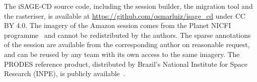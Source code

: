 
The iSAGE-CD source code, including the session builder, the
migration tool and the rasteriser, is available at
\url{https://github.com/osmarluiz/isage_cd} under CC BY 4.0. The
imagery of the Amazon session comes from the Planet NICFI
programme~\cite{nicfi2021basemaps} and cannot be redistributed by
the authors. The sparse annotations of the session are available
from the corresponding author on reasonable request, and can be
reused by any team with its own access to the same imagery. The
PRODES reference product, distributed by Brazil's National
Institute for Space Research (INPE), is publicly
available~\cite{prodes}.
